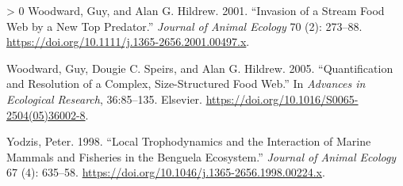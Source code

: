 \documentclass{article}
\newlength{\cslhangindent}
\newenvironment{CSLReferences}[3] %
 {%
  \setlength{\parindent}{0pt}
  \ifodd #1 \everypar{\setlength{\hangindent}{\cslhangindent}}\ignorespaces\fi
  \ifnum #2 > 0
  \setlength{\parskip}{#2\baselineskip}
  \fi
 }%
 {}
\begin{document}
\begin{CSLReferences}{1}{0}
\leavevmode\hypertarget{ref-woodwardInvasionStreamFood2001}{}%
Woodward, Guy, and Alan G. Hildrew. 2001. {``Invasion of a Stream Food
Web by a New Top Predator.''} \emph{Journal of Animal Ecology} 70 (2):
273--88. \url{https://doi.org/10.1111/j.1365-2656.2001.00497.x}.

\leavevmode\hypertarget{ref-woodwardQuantificationResolutionComplex2005}{}%
Woodward, Guy, Dougie C. Speirs, and Alan G. Hildrew. 2005.
{``Quantification and {Resolution} of a {Complex}, {Size}-{Structured
Food Web}.''} In \emph{Advances in {Ecological Research}}, 36:85--135.
{Elsevier}. \url{https://doi.org/10.1016/S0065-2504(05)36002-8}.

\leavevmode\hypertarget{ref-yodzisLocalTrophodynamicsInteraction1998}{}%
Yodzis, Peter. 1998. {``Local Trophodynamics and the Interaction of
Marine Mammals and Fisheries in the {Benguela} Ecosystem.''}
\emph{Journal of Animal Ecology} 67 (4): 635--58.
\url{https://doi.org/10.1046/j.1365-2656.1998.00224.x}.

\end{CSLReferences}



\end{document}
